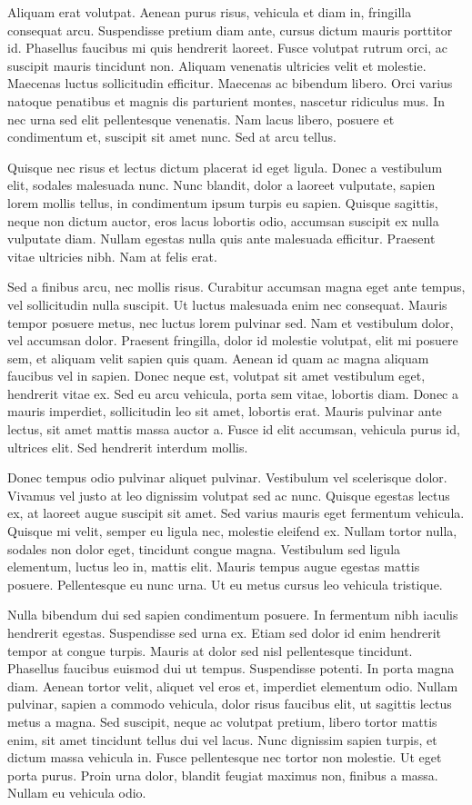 Aliquam erat volutpat. Aenean purus risus, vehicula et diam in, fringilla consequat arcu. Suspendisse pretium diam ante, cursus dictum mauris porttitor id. Phasellus faucibus mi quis hendrerit laoreet. Fusce volutpat rutrum orci, ac suscipit mauris tincidunt non. Aliquam venenatis ultricies velit et molestie. Maecenas luctus sollicitudin efficitur. Maecenas ac bibendum libero. Orci varius natoque penatibus et magnis dis parturient montes, nascetur ridiculus mus. In nec urna sed elit pellentesque venenatis. Nam lacus libero, posuere et condimentum et, suscipit sit amet nunc. Sed at arcu tellus.

Quisque nec risus et lectus dictum placerat id eget ligula. Donec a vestibulum elit, sodales malesuada nunc. Nunc blandit, dolor a laoreet vulputate, sapien lorem mollis tellus, in condimentum ipsum turpis eu sapien. Quisque sagittis, neque non dictum auctor, eros lacus lobortis odio, accumsan suscipit ex nulla vulputate diam. Nullam egestas nulla quis ante malesuada efficitur. Praesent vitae ultricies nibh. Nam at felis erat.

Sed a finibus arcu, nec mollis risus. Curabitur accumsan magna eget ante tempus, vel sollicitudin nulla suscipit. Ut luctus malesuada enim nec consequat. Mauris tempor posuere metus, nec luctus lorem pulvinar sed. Nam et vestibulum dolor, vel accumsan dolor. Praesent fringilla, dolor id molestie volutpat, elit mi posuere sem, et aliquam velit sapien quis quam. Aenean id quam ac magna aliquam faucibus vel in sapien. Donec neque est, volutpat sit amet vestibulum eget, hendrerit vitae ex. Sed eu arcu vehicula, porta sem vitae, lobortis diam. Donec a mauris imperdiet, sollicitudin leo sit amet, lobortis erat. Mauris pulvinar ante lectus, sit amet mattis massa auctor a. Fusce id elit accumsan, vehicula purus id, ultrices elit. Sed hendrerit interdum mollis.

Donec tempus odio pulvinar aliquet pulvinar. Vestibulum vel scelerisque dolor. Vivamus vel justo at leo dignissim volutpat sed ac nunc. Quisque egestas lectus ex, at laoreet augue suscipit sit amet. Sed varius mauris eget fermentum vehicula. Quisque mi velit, semper eu ligula nec, molestie eleifend ex. Nullam tortor nulla, sodales non dolor eget, tincidunt congue magna. Vestibulum sed ligula elementum, luctus leo in, mattis elit. Mauris tempus augue egestas mattis posuere. Pellentesque eu nunc urna. Ut eu metus cursus leo vehicula tristique.

Nulla bibendum dui sed sapien condimentum posuere. In fermentum nibh iaculis hendrerit egestas. Suspendisse sed urna ex. Etiam sed dolor id enim hendrerit tempor at congue turpis. Mauris at dolor sed nisl pellentesque tincidunt. Phasellus faucibus euismod dui ut tempus. Suspendisse potenti. In porta magna diam. Aenean tortor velit, aliquet vel eros et, imperdiet elementum odio. Nullam pulvinar, sapien a commodo vehicula, dolor risus faucibus elit, ut sagittis lectus metus a magna. Sed suscipit, neque ac volutpat pretium, libero tortor mattis enim, sit amet tincidunt tellus dui vel lacus. Nunc dignissim sapien turpis, et dictum massa vehicula in. Fusce pellentesque nec tortor non molestie. Ut eget porta purus. Proin urna dolor, blandit feugiat maximus non, finibus a massa. Nullam eu vehicula odio.
